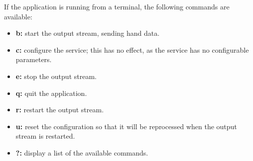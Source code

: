If the application is running from a terminal, the following commands are available:
\begin{itemize}
\item \textbf{b:} start the output stream, sending hand data. 
\item \textbf{c:} configure the service; this has no effect, as the service has no
configurable parameters. 
\item \textbf{e:} stop the output stream. 
\item \textbf{q:} quit the application. 
\item \textbf{r:} restart the output stream. 
\item \textbf{u:} reset the configuration so that it will be reprocessed when the output
stream is restarted. 
\item \textbf{?:} display a list of the available commands.
\end{itemize}
\primaryEnd{}
